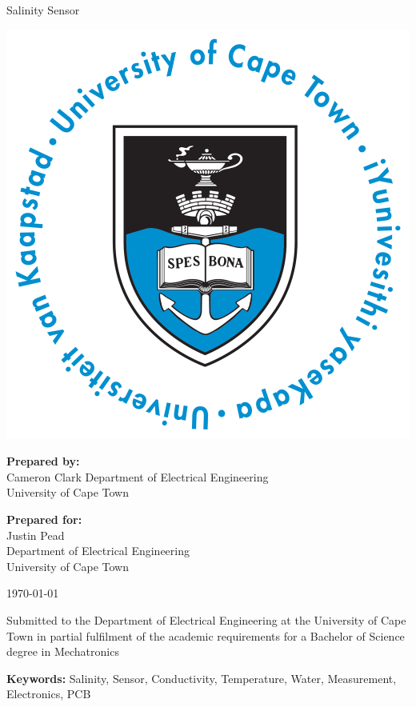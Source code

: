 \thispagestyle{empty}
\begin{center}
    
\Huge

\vspace{5cm}

Salinity Sensor

\vspace{1cm}

\includegraphics[width=0.4\linewidth]{FrontMatter/UCT_logo}

\vfill

\large
\textbf{Prepared by:}\\
Cameron Clark
Department of Electrical Engineering\\
University of Cape Town\\

\vspace{1cm}

\textbf{Prepared for:}\\
Justin Pead\\
Department of Electrical Engineering\\
University of Cape Town

\vspace{1cm}

\today

\vspace{1cm}

Submitted to the Department of Electrical Engineering at the University of Cape Town in partial
fulfilment of the academic requirements for a Bachelor of Science degree in Mechatronics


\vspace{1cm}
\textbf{Keywords:} Salinity, Sensor, Conductivity, Temperature, Water, Measurement, Electronics, PCB

\end{center}